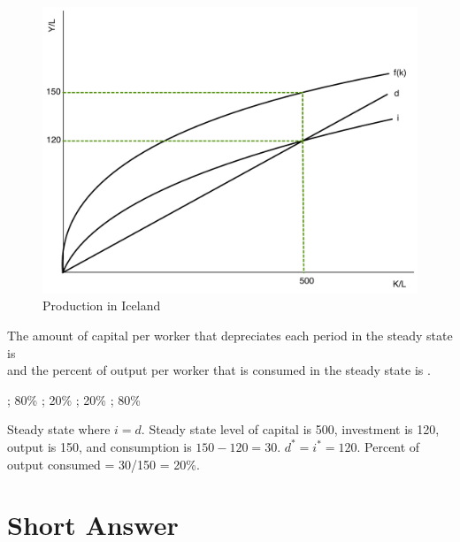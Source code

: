 \documentclass[addpoints,11pt]{exam}
\theoremstyle{definition}
\newcommand{\blank}[0]{\underline{\hspace{3cm}}}
\begin{document}
\begin{questions}
			\begin{figure}[H]
				\centering
				\includegraphics[scale=.4]{Exam2_MC30.pdf}
				\caption{Production in Iceland}
				\label{MC30}
			\end{figure}
			
			The amount of capital per worker that depreciates each period in the steady state is \\ \blank and the percent of output per worker that is consumed in the steady state is \blank.
			
			\begin{choices}
				; 80\%
				; 20\%
				; 20\%
				; 80\%
			\end{choices}
			
			\begin{solution}
				Steady state where $i=d$. Steady state level of capital is 500, investment is 120, output is 150, and consumption is $150-120=30$. $d^* = i^* = 120$. Percent of output consumed = 30/150 = 20\%.
			\end{solution}
		
		
\end{questions}


\section*{Short Answer}
\end{document}
